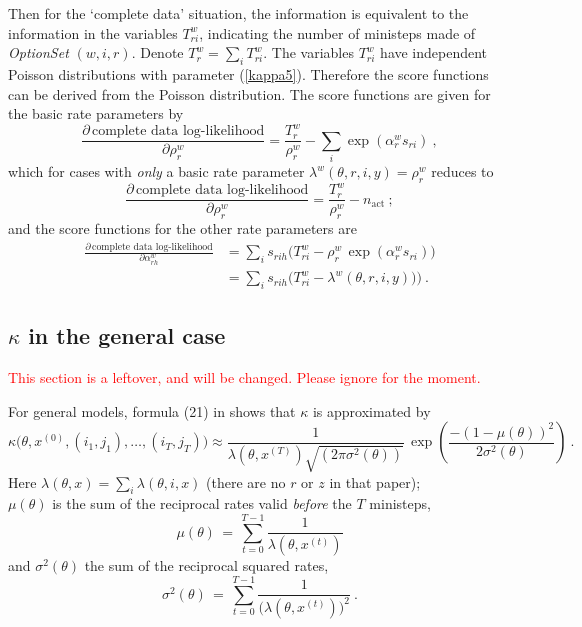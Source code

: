 \documentclass[a4paper,12pt,fleqn]{article}
\newcommand{\remark}[1]{{\textcolor[named]{Red}{#1}}}
\begin{document}
\begin{appendices}
Then for the `complete data' situation, the information is equivalent to
the information in the variables $T^w_{ri}$, indicating the
number of ministeps made of \textit{OptionSet} $(w,i,r)$.
Denote $T^w_r = \sum_i T^w_{ri}$.
The variables $T^w_{ri}$ have independent Poisson distributions
with parameter (\ref{kappa5}). Therefore the score functions
can be derived from the Poisson distribution.
The score functions are given
for the basic rate parameters by
\begin{equation}
\frac{\partial\, \text{complete data log-likelihood}}{\partial \rho^w_r} =
    \frac{T^w_r}{\rho^w_r} - \sum_i \exp(\alpha^w_{r} s_{ri}) \  , \label{score2}
\end{equation}
which for cases with \emph{only} a basic rate parameter
$ \lambda^w(\theta, r,i, y) = \rho^w_r $ reduces to
\begin{equation}
\frac{\partial\, \text{complete data log-likelihood}}{\partial \rho^w_r} =
  \frac{T^w_r}{\rho^w_r}  - n_{\text{act}}  \  ; \label{score3}
\end{equation}
and the score functions for the other rate parameters are
\begin{align}
\frac{\partial \, \text{complete data log-likelihood}}{\partial \alpha^w_{rh}}  & =
   \sum_i s_{rih} \big(T^w_{ri} - \rho^w_r \, \exp(\alpha^w_{r} s_{ri} )  \big)\\
  & = \sum_i s_{rih} \big(T^w_{ri} -  \lambda^w(\theta, r,i, y) )  \big)
               \  . \label{score4}
\end{align}

\iffalse
\subsection{$\kappa$ in the general case}

\remark{This section is a leftover, and will be changed.
Please ignore for the moment.}

For general models, formula (21) in \citet{SnijdersEA10a} shows that $\kappa$ is
approximated by
\begin{equation}
\kappa\big(\theta, x^{(0)}, (i_1, j_1), \ldots, (i_T,j_T) \big)
   \approx    \frac{1}{\lambda(\theta, x^{(T)}) \sqrt{(2\pi \sigma^2(\theta))}}
              \, \exp\left( \frac{-(1 - \mu(\theta))^2}{2\sigma^2(\theta)}\right) \ .
                                   \label{kappa3}
\end{equation}
Here
$\lambda(\theta, x) =  \sum_i \lambda(\theta,i,x)$ (there are no $r$ or $z$ in
that paper);\\
$\mu(\theta)$ is the sum of the reciprocal rates valid \emph{before} the $T$
ministeps,
\begin{equation}
  \mu(\theta) \,=\, \sum_{t=0}^{T-1} \frac1{\lambda(\theta, x^{(t)})}  \label{kmu}
\end{equation}
and $\sigma^2(\theta)$ the sum of the reciprocal squared rates,
\begin{equation}
  \sigma^2(\theta) \,=\, \sum_{t=0}^{T-1} \frac1{\big(\lambda(\theta, x^{(t)})\big)^2} \
  . \label{ksigma2}
\end{equation}


\end{appendices}
\end{document}
